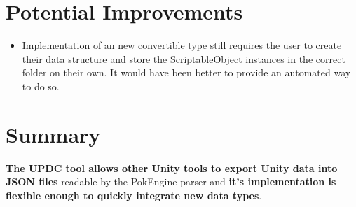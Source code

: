 \documentclass[12pt,a4paper]{article}
\begin{document}
\section{Potential Improvements}
\begin{itemize}
\item Implementation of an new convertible type still requires the user to create their data structure and store the ScriptableObject instances in the correct folder on their own. It would have been better to provide an automated way to do so.
\end{itemize}

\section{Summary}
\textbf{The UPDC tool allows other Unity tools to export Unity data into JSON files} readable by the PokEngine parser and \textbf{it's implementation is flexible enough to quickly integrate new data types}.\\\\
\end{document}
